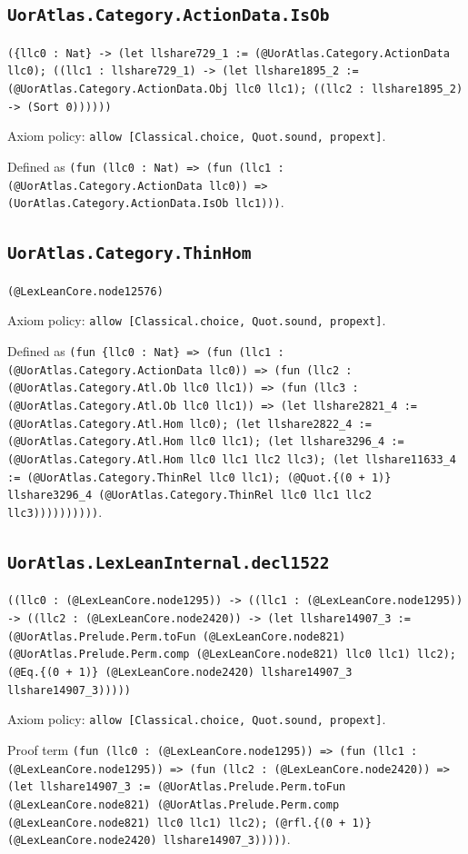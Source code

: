 \documentclass[11pt]{article}
\begin{document}
\subsection*{\texttt{UorAtlas.Category.ActionData.IsOb}}
\noindent\texttt{(\{llc0 : Nat\} -> (let llshare729\_1 := (@UorAtlas.Category.ActionData llc0); ((llc1 : llshare729\_1) -> (let llshare1895\_2 := (@UorAtlas.Category.ActionData.Obj llc0 llc1); ((llc2 : llshare1895\_2) -> (Sort 0))))))}\par
\noindent Axiom policy: \texttt{allow [Classical.choice, Quot.sound, propext]}.\par
\noindent Defined as \texttt{(fun (llc0 : Nat) => (fun (llc1 : (@UorAtlas.Category.ActionData llc0)) => (UorAtlas.Category.ActionData.IsOb llc1)))}.\par
\subsection*{\texttt{UorAtlas.Category.ThinHom}}
\noindent\texttt{(@LexLeanCore.node12576)}\par
\noindent Axiom policy: \texttt{allow [Classical.choice, Quot.sound, propext]}.\par
\noindent Defined as \texttt{(fun \{llc0 : Nat\} => (fun (llc1 : (@UorAtlas.Category.ActionData llc0)) => (fun (llc2 : (@UorAtlas.Category.Atl.Ob llc0 llc1)) => (fun (llc3 : (@UorAtlas.Category.Atl.Ob llc0 llc1)) => (let llshare2821\_4 := (@UorAtlas.Category.Atl.Hom llc0); (let llshare2822\_4 := (@UorAtlas.Category.Atl.Hom llc0 llc1); (let llshare3296\_4 := (@UorAtlas.Category.Atl.Hom llc0 llc1 llc2 llc3); (let llshare11633\_4 := (@UorAtlas.Category.ThinRel llc0 llc1); (@Quot.\{(0 + 1)\} llshare3296\_4 (@UorAtlas.Category.ThinRel llc0 llc1 llc2 llc3))))))))))}.\par
\subsection*{\texttt{UorAtlas.LexLeanInternal.decl1522}}
\noindent\texttt{((llc0 : (@LexLeanCore.node1295)) -> ((llc1 : (@LexLeanCore.node1295)) -> ((llc2 : (@LexLeanCore.node2420)) -> (let llshare14907\_3 := (@UorAtlas.Prelude.Perm.toFun (@LexLeanCore.node821) (@UorAtlas.Prelude.Perm.comp (@LexLeanCore.node821) llc0 llc1) llc2); (@Eq.\{(0 + 1)\} (@LexLeanCore.node2420) llshare14907\_3 llshare14907\_3)))))}\par
\noindent Axiom policy: \texttt{allow [Classical.choice, Quot.sound, propext]}.\par
\noindent Proof term \texttt{(fun (llc0 : (@LexLeanCore.node1295)) => (fun (llc1 : (@LexLeanCore.node1295)) => (fun (llc2 : (@LexLeanCore.node2420)) => (let llshare14907\_3 := (@UorAtlas.Prelude.Perm.toFun (@LexLeanCore.node821) (@UorAtlas.Prelude.Perm.comp (@LexLeanCore.node821) llc0 llc1) llc2); (@rfl.\{(0 + 1)\} (@LexLeanCore.node2420) llshare14907\_3)))))}.\par
\end{document}

